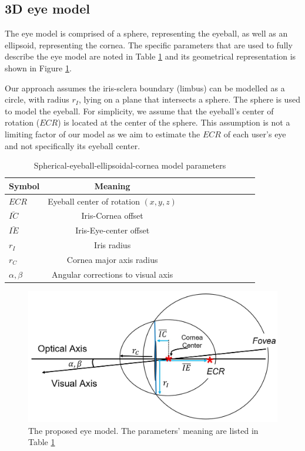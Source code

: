 \documentclass{article}
\begin{document}
\subsection{3D eye model}
The eye model is comprised of a sphere, representing the eyeball, as well as an ellipsoid, representing the cornea.  The specific parameters that are used to fully describe the eye model are noted in Table \ref{tab:model_parameters} and its geometrical representation is shown in Figure \ref{fig:model_drawing}. 

Our approach assumes the iris-sclera boundary (limbus) can be modelled as a circle, with radius $r_I$, lying on a plane that intersects a sphere. The sphere is used to model the eyeball. For simplicity, we assume that the eyeball's center of rotation ($ECR$) is located at the center of the sphere. This assumption is not a limiting factor of our model as we aim to estimate the $ECR$ of each user's eye and not specifically its eyeball center. 


\begin{table}[h!]
\caption{Spherical-eyeball-ellipsoidal-cornea model parameters}
\vspace{0.5cm}
\centering
\begin{tabular}{|l|c|c|c|c|c|c|c|c|c|c|}
\hline
Symbol & Meaning \\
\hline \hline
$ECR$ &  Eyeball center of rotation $(x,y,z)$\\ \hline 
$\bar{IC}$  &  Iris-Cornea offset\\ \hline
$\bar{IE}$ &  Iris-Eye-center offset \\ \hline
$r_I$ &  Iris radius \\ \hline
$r_C$ &  Cornea major axis radius \\ \hline
$\alpha, \beta$ &  Angular corrections to visual axis \\ 
\hline
\end{tabular}
\label{tab:model_parameters}
\end{table}
\begin{figure}[h!]
    \center
    \includegraphics[scale=0.3]{./Pics/blink_eye_model}
    \caption{The proposed eye model.  The parameters' meaning are listed in Table \ref{tab:model_parameters}}
    \label{fig:model_drawing}
\end{figure}
\end{document}
